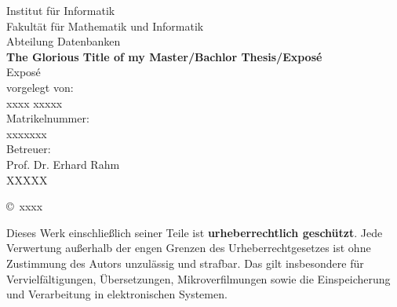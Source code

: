 \documentclass{article}
\newcommand{\titel}{The Glorious Title of my Master/Bachlor Thesis/Exposé}
\newcommand{\art}{Exposé} %
\newcommand{\fachgebiet}{Abteilung Datenbanken}
\newcommand{\fakultaet}{Fakultät für Mathematik und Informatik}
\newcommand{\institut}{Institut für Informatik}
\newcommand{\autor}{xxxx xxxxx}
\newcommand{\matrikelnr}{xxxxxxx}
\newcommand{\erstbetreuer}{Prof. Dr. Erhard Rahm}
\newcommand{\zweitbetreuer}{XXXXX}
\newcommand{\jahr}{xxxx}
\begin{document}
\thispagestyle{plain}
\begin{titlepage}

\begin{center}

\institut\\
\fakultaet\\
\fachgebiet\\[6ex]

\textbf{\large\titel}\\[1.5ex]
\art\\[6ex]

\normalsize
vorgelegt von:\\
\autor\\[1.5ex]
Matrikelnummer:\\
\matrikelnr\\[1.5ex]
Betreuer:\\
\erstbetreuer\\
\zweitbetreuer\\[1.0ex]
\end{center}


\begin{center}
\copyright\ \jahr\\[1.0ex]
\end{center}

\singlespacing
\small
\noindent Dieses Werk einschließlich seiner Teile ist \textbf{urheberrechtlich geschützt}. Jede Verwertung außerhalb der engen Grenzen des Urheberrechtgesetzes ist ohne Zustimmung des Autors unzulässig und strafbar. Das gilt insbesondere für Vervielfältigungen, Übersetzungen, Mikroverfilmungen sowie die Einspeicherung und Verarbeitung in elektronischen Systemen.

\end{titlepage}


\tableofcontents{}

\newpage
\end{document}
